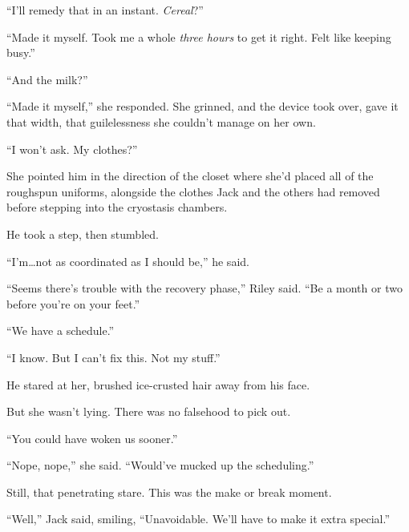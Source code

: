 ``I'll remedy that in an instant.  \emph{Cereal}?''



``Made it myself.  Took me a whole \emph{three hours} to get it right.  Felt like keeping busy.''



``And the milk?''



``Made it myself,'' she responded.  She grinned, and the device took over, gave it that width, that guilelessness she couldn't manage on her own.



``I won't ask.  My clothes?''



She pointed him in the direction of the closet where she'd placed all of the roughspun uniforms, alongside the clothes Jack and the others had removed before stepping into the cryostasis chambers.



He took a step, then stumbled.



``I'm\ldots not as coordinated as I should be,'' he said.



``Seems there's trouble with the recovery phase,'' Riley said.  ``Be a month or two before you're on your feet.''



``We have a schedule.''



``I know.  But I can't fix this.  Not my stuff.''



He stared at her, brushed ice-crusted hair away from his face.



But she wasn't lying.  There was no falsehood to pick out.



``You could have woken us sooner.''



``Nope, nope,'' she said.  ``Would've mucked up the scheduling.''



Still, that penetrating stare.  This was the make or break moment.



``Well,'' Jack said, smiling, ``Unavoidable.  We'll have to make it extra special.''



